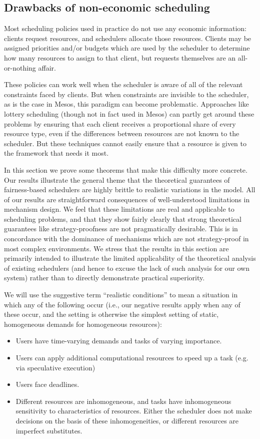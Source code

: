 \documentclass{acm_proc_article-sp}
\begin{document}
\subsection{Drawbacks of non-economic scheduling}\label{drawbacks}
Most scheduling policies used in practice do not use any economic information: clients request resources, and schedulers allocate those resources. Clients may be assigned priorities and/or budgets which are used by the scheduler to determine how many resources to assign to that client, but requests themselves are an all-or-nothing affair.

These policies can work well when the scheduler is aware of all of the relevant constraints faced by clients. But when constraints are invisible to the scheduler, as is the case in Mesos, this paradigm can become problematic. Approaches like lottery scheduling (though not in fact used in Mesos) can partly get around these problems by ensuring that each client receives a proportional share of every resource type, even if the differences between resources are not known to the scheduler. But these techniques cannot easily ensure that a resource is given to the framework that needs it most.

In this section we prove some theorems that make this difficulty more concrete. Our results illustrate the general theme that the theoretical guarantees of fairness-based schedulers are highly brittle to realistic variations in the model. All of our results are straightforward consequences of well-understood limitations in mechanism design. We feel that these limitations are real and applicable to scheduling problems, and that they show fairly clearly that strong theoretical guarantees like strategy-proofness are not pragmatically desirable. This is in concordance with the dominance of mechanisms which are not strategy-proof in most complex environments. We stress that the results in this section are primarily intended to illustrate the limited applicability of the theoretical analysis of existing schedulers (and hence to excuse the lack of such analysis for our own system) rather than to directly demonstrate practical superiority.

We will use the suggestive term ``realistic conditions'' to mean a situation in which any of the following occur (i.e., our negative results apply when any of these occur, and the setting is otherwise the simplest setting of static, homogeneous demands for homogeneous resources):

\begin{itemize}
\item Users have time-varying demands and tasks of varying importance.
\item Users can apply additional computational resources to speed up a task (e.g. via speculative execution)
\item Users face deadlines.
\item Different resources are inhomogeneous, and tasks have inhomogeneous sensitivity to characteristics of resources. Either the scheduler does not make decisions on the basis of these inhomogeneities, or different resources are imperfect substitutes.
\end{itemize}
\end{document}

